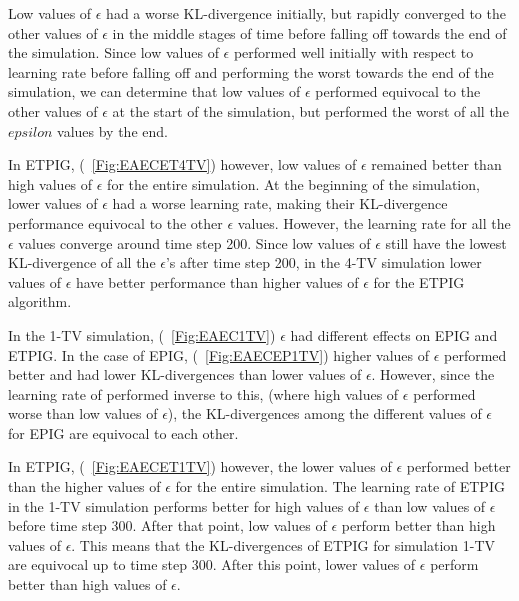 \documentclass[letterpaper]{article} %
\begin{document}
Low values of $\epsilon$ had a worse KL-divergence initially, but rapidly converged to the other values of $\epsilon$ in the middle stages of time before falling off towards the end of the simulation. Since low values of $\epsilon$ performed well initially with respect to learning rate before falling off and performing the worst towards the end of the simulation, we can determine that low values of $\epsilon$ performed equivocal to the other values of $\epsilon$ at the start of the simulation, but performed the worst of all the $epsilon$ values by the end.


In ETPIG, (\figurename~\ref{Fig:EAECET4TV}) however, low values of $\epsilon$ remained better than high values of $\epsilon$ for the entire simulation. At the beginning of the simulation, lower values of $\epsilon$ had a worse learning rate, making their KL-divergence performance equivocal to the other $\epsilon$ values. However, the learning rate for all the $\epsilon$ values converge around time step 200. Since low values of $\epsilon$ still have the lowest KL-divergence of all the $\epsilon$'s after time step 200, in the 4-TV simulation lower values of $\epsilon$ have better performance than higher values of $\epsilon$ for the ETPIG algorithm.

In the 1-TV simulation, (\figurename~\ref{Fig:EAEC1TV}) $\epsilon$ had different effects on EPIG and ETPIG. In the case of EPIG, (\figurename~\ref{Fig:EAECEP1TV}) higher values of $\epsilon$ performed better and had lower KL-divergences than lower values of $\epsilon$. However, since the learning rate of performed inverse to this, (where high values of $\epsilon$ performed worse than low values of $\epsilon$), the KL-divergences among the different values of $\epsilon$ for EPIG are equivocal to each other.

In ETPIG, (\figurename~\ref{Fig:EAECET1TV}) however, the lower values of $\epsilon$ performed better than the higher values of $\epsilon$ for the entire simulation. The learning rate of ETPIG in the 1-TV simulation performs better for high values of $\epsilon$ than low values of $\epsilon$ before time step 300. After that point, low values of $\epsilon$ perform better than high values of $\epsilon$. This means that the KL-divergences of ETPIG for simulation 1-TV are equivocal up to time step 300. After this point, lower values of $\epsilon$ perform better than high values of $\epsilon$.
\end{document}
